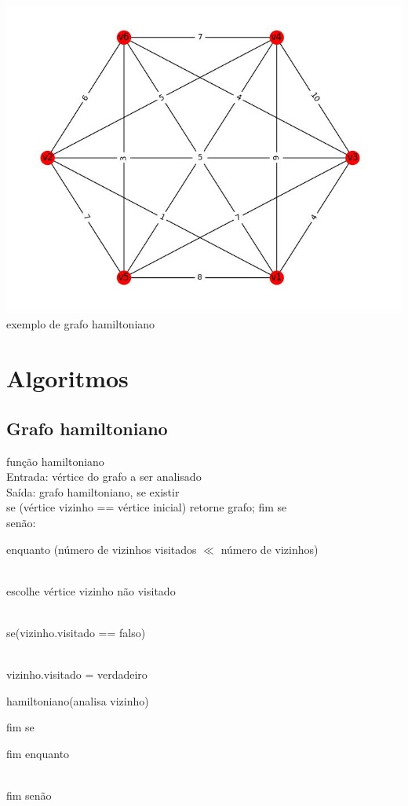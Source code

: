 \documentclass{article}
\begin{document}
\includegraphics[scale=0.4]{Caixeiro.jpg}
\\exemplo de grafo hamiltoniano

\pagebreak

\section{Algoritmos}

\subsection{Grafo hamiltoniano}

função hamiltoniano\\
Entrada: vértice do grafo a ser analisado\\
Saída: grafo hamiltoniano, se existir\\

se (vértice vizinho == vértice inicial) retorne grafo; fim se\\

senão:

\hspace{\parindent}enquanto (número de vizinhos visitados $\ll$ número de vizinhos)\par\\
\hspace{6ex}escolhe vértice vizinho não visitado\par\\
\hspace{6ex}se(vizinho.visitado == falso)\par\\
\hspace{9ex}vizinho.visitado = verdadeiro\par
\hspace{9ex}hamiltoniano(analisa vizinho)\par
\hspace{6ex}fim se\par
\hspace{\parindent}fim enquanto\par\\
fim senão\\
\end{document}
